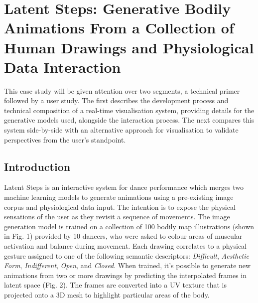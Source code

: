 \section[Latent Steps]{Latent Steps: Generative Bodily Animations From a Collection of Human Drawings and Physiological Data Interaction}

\label{case_studies:latent_steps}

This case study will be given attention over two segments, a technical primer followed by a user study. The first describes the development process and technical composition of a real-time visualisation system, providing details for the generative models used, alongside the interaction process. The next compares this system side-by-side with an alternative approach for visualisation to validate perspectives from the user's standpoint.




\subsection{Introduction}

Latent Steps is an interactive system for dance performance which merges two machine learning models to generate animations using a pre-existing image corpus and physiological data input. The intention is to expose the physical sensations of the user as they revisit a sequence of movements.
The image generation model is trained on a collection of 100 bodily map illustrations (shown in Fig. 1) provided by 10 dancers, who were asked to colour areas of muscular activation and balance during movement. Each drawing correlates to a physical gesture assigned to one of the following semantic descriptors: \textit{Difficult}, \textit{Aesthetic Form}, \textit{Indifferent}, \textit{Open}, and \textit{Closed}. When trained, it’s possible to generate new animations from two or more drawings by predicting the interpolated frames in latent space (Fig. 2). The frames are converted into a UV texture that is projected onto a 3D mesh to highlight particular areas of the body.

